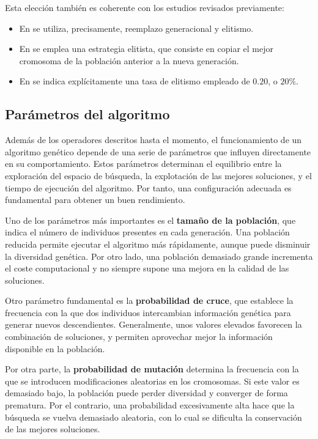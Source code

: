 Esta elección también es coherente con los estudios revisados previamente: 

\begin{itemize}
\item En \cite{curkovic2025} se utiliza, precisamente, reemplazo generacional y elitismo.
\item En \cite{abdoun2012} se emplea una estrategia elitista, que consiste en copiar el mejor cromosoma de la población 
anterior a la nueva generación.
\item En \cite{bye2021} se indica explícitamente una tasa de elitismo empleado de $0.20$, o $20\%$.
\end{itemize}

\subsection{Parámetros del algoritmo}
\label{subsec:params}

Además de los operadores descritos hasta el momento, el funcionamiento de un algoritmo genético depende de una serie de 
parámetros que influyen directamente en su comportamiento. Estos parámetros determinan el equilibrio entre la exploración
del espacio de búsqueda, la explotación de las mejores soluciones, y el tiempo de ejecución del algoritmo. Por tanto, una
configuración adecuada es fundamental para obtener un buen rendimiento.

Uno de los parámetros más importantes es el \textbf{tamaño de la población}, que indica el número de individuos presentes
en cada generación. Una población reducida permite ejecutar el algoritmo más rápidamente, aunque puede disminuir la diversidad
genética. Por otro lado, una población demasiado grande incrementa el coste computacional y no siempre supone una mejora en 
la calidad de las soluciones. 

Otro parámetro fundamental es la \textbf{probabilidad de cruce}, que establece la frecuencia con la que dos individuos
intercambian información genética para generar nuevos descendientes. Generalmente, unos valores elevados favorecen la 
combinación de soluciones, y permiten aprovechar mejor la información disponible en la población.

Por otra parte, la \textbf{probabilidad de mutación} determina la frecuencia con la que se introducen modificaciones aleatorias
en los cromosomas. Si este valor es demasiado bajo, la población puede perder diversidad y converger de forma prematura. 
Por el contrario, una probabilidad excesivamente alta hace que la búsqueda se vuelva demasiado aleatoria, con lo cual se 
dificulta la conservación de las mejores soluciones.

